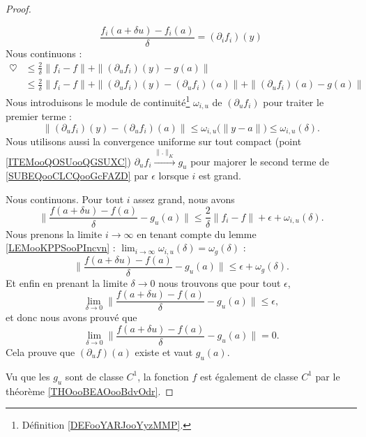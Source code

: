 \begin{proof}
\begin{subproof}
        \begin{equation}
            \frac{ f_i(a+\delta u)-f_i(a) }{ \delta }=(\partial_if_i)(y)
        \end{equation}
        Nous continuons :
        \begin{subequations}
            \begin{align}
                \heartsuit&\leq\frac{ 2 }{ \delta }\| f_i-f \|+\| (\partial_uf_i)(y)-g(a) \|\\
                &\leq \frac{ 2 }{ \delta }\| f_i-f \|+\| (\partial_uf_i)(y)-(\partial_uf_i)(a) \|+\| (\partial_uf_i)(a)-g(a) \| \label{SUBEQooCLCQooGcFAZD}
            \end{align}
        \end{subequations}
        Nous introduisons le module de continuité\footnote{Définition \ref{DEFooYARJooYyzMMP}.} \( \omega_{i,u}\) de \( (\partial_uf_i)\) pour traiter le premier terme :
        \begin{equation}
            \| (\partial_uf_i)(y)-(\partial_uf_i)(a) \|\leq\omega_{i,u}\big( \| y-a \| \big)\leq \omega_{i,u}(\delta).
        \end{equation}
        Nous utilisons aussi la convergence uniforme sur tout compact (point \ref{ITEMooQOSUooQGSUXC}) \( \partial_uf_i\stackrel{\| . \|_K}{\longrightarrow}g_u\) pour majorer le second terme de \eqref{SUBEQooCLCQooGcFAZD} par \( \epsilon\) lorsque \( i\) est grand.

        Nous continuons. Pour tout \( i\) assez grand, nous avons
        \begin{equation}
                \| \frac{ f(a+\delta u)-f(a) }{ \delta }-g_u(a) \|\leq \frac{ 2 }{ \delta }\| f_i-f \|+\epsilon+\omega_{i,u}(\delta).
        \end{equation}
        Nous prenons la limite \( i\to \infty\) en tenant compte du lemme \ref{LEMooKPPSooPIncvn} : \( \lim_{i\to \infty} \omega_{i,u}(\delta)=\omega_g(\delta)\) :
        \begin{equation}
                \| \frac{ f(a+\delta u)-f(a) }{ \delta }-g_u(a) \|\leq \epsilon+\omega_g(\delta).
        \end{equation}
        Et enfin en prenant la limite \( \delta\to 0\) nous trouvons que pour tout \( \epsilon\),
        \begin{equation}
            \lim_{\delta\to 0} \| \frac{ f(a+\delta u)-f(a) }{ \delta }-g_u(a) \|\leq \epsilon,
        \end{equation}
        et donc nous avons prouvé que
        \begin{equation}
            \lim_{\delta\to 0} \| \frac{ f(a+\delta u)-f(a) }{ \delta }-g_u(a) \|=0.
        \end{equation}
        Cela prouve que \( (\partial_uf)(a)\) existe et vaut \( g_u(a)\).
    \end{subproof}
    Vu que les \( g_u\) sont de classe \( C^1\), la fonction \( f\) est également de classe \( C^1\) par le théorème \ref{THOooBEAOooBdvOdr}.
\end{proof}

